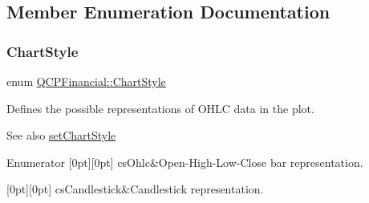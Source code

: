 \subsection{Member Enumeration Documentation}
\mbox{\label{class_q_c_p_financial_a0f800e21ee98d646dfc6f8f89d10ebfb}} 
\subsubsection{\texorpdfstring{Chart\+Style}{ChartStyle}}
{\footnotesize\ttfamily enum \hyperlink{class_q_c_p_financial_a0f800e21ee98d646dfc6f8f89d10ebfb}{Q\+C\+P\+Financial\+::\+Chart\+Style}}

Defines the possible representations of O\+H\+LC data in the plot.

\begin{DoxySeeAlso}{See also}
\hyperlink{class_q_c_p_financial_a5a59175d36279d71596e64d7bb65596f}{set\+Chart\+Style} 
\end{DoxySeeAlso}
\begin{DoxyEnumFields}{Enumerator}
[0pt][0pt]{}\mbox{\label{class_q_c_p_financial_a0f800e21ee98d646dfc6f8f89d10ebfba3a516016c9298d3e95dd82aa203c4390}} 
cs\+Ohlc&Open-\/\+High-\/\+Low-\/\+Close bar representation. \\
\hline

[0pt][0pt]{}\mbox{\label{class_q_c_p_financial_a0f800e21ee98d646dfc6f8f89d10ebfbac803cbd39f26e3f206bcc7028679e62f}} 
cs\+Candlestick&Candlestick representation. \\
\hline

\end{DoxyEnumFields}
\mbox{\label{class_q_c_p_financial_aef1761dda71a53dc5269685e9e492626}} 
